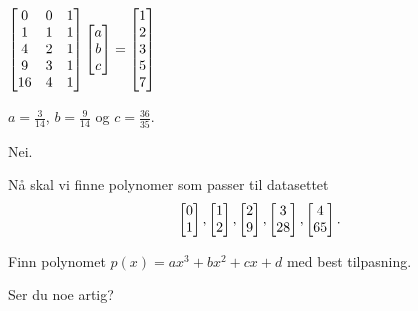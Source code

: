 \begin{losning}
\begin{punkt}
$
\begin{bmatrix}
0 & 0 & 1\\
1 & 1 & 1\\
4 & 2 & 1\\
9 & 3 & 1\\
16 & 4 & 1
\end{bmatrix}\begin{bmatrix} a \\ b \\ c \end{bmatrix}=\begin{bmatrix}
1\\
2\\
3\\
5\\
7
\end{bmatrix}$
\end{punkt}

\begin{punkt}
$a=\frac{3}{14}$, $b=\frac{9}{14}$ og $c=\frac{36}{35}$.
\end{punkt}

\begin{punkt}
Nei.
\end{punkt}

\end{losning}


\begin{oppgave}
Nå skal vi finne polynomer som passer til datasettet 
$$\begin{bmatrix} 0 \\ 1 \end{bmatrix}, \begin{bmatrix} 1 \\ 2 \end{bmatrix}, \begin{bmatrix} 2 \\ 9 \end{bmatrix},\begin{bmatrix} 3 \\ 28 \end{bmatrix},\begin{bmatrix} 4 \\ 65 \end{bmatrix}.$$ 
\begin{punkt}
Finn polynomet $p(x)=ax^3+bx^2+cx+d$ med best tilpasning.
\end{punkt}

\begin{punkt}
Ser du noe artig?
\end{punkt}

\end{oppgave}


